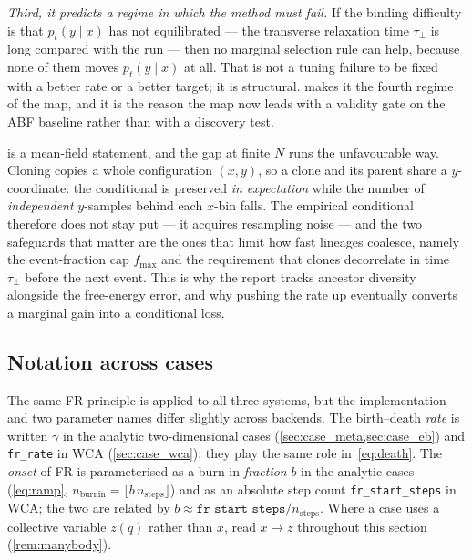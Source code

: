\emph{Third, it predicts a regime in which the method must fail.} If the binding difficulty
is that $p_t(y\mid x)$ has not equilibrated --- the transverse relaxation time
$\tau_\perp$ is long compared with the run --- then no marginal selection rule can help,
because none of them moves $p_t(y\mid x)$ at all. That is not a tuning failure to be fixed
with a better rate or a better target; it is structural.  makes it the
fourth regime of the map, and it is the reason the map now leads with a validity gate on the
ABF baseline rather than with a discovery test.

\begin{remark}
\label{rem:finite_n_conditional}
 is a mean-field statement, and the gap at finite $N$ runs the
unfavourable way. Cloning copies a whole configuration $(x,y)$, so a clone and its parent
share a $y$-coordinate: the conditional is preserved \emph{in expectation} while the number
of \emph{independent} $y$-samples behind each $x$-bin falls. The empirical conditional
therefore does not stay put --- it acquires resampling noise --- and the two safeguards that
matter are the ones that limit how fast lineages coalesce, namely the event-fraction cap
$f_{\max}$ and the requirement that clones decorrelate in time $\tau_\perp$ before the next
event. This is why the report tracks ancestor diversity alongside the free-energy error, and
why pushing the rate up eventually converts a marginal gain into a conditional loss.
\end{remark}

\subsection{Notation across cases}
\label{sec:fr_notation}
The same FR principle is applied to all three systems, but the implementation and
two parameter names differ slightly across backends. The birth--death \emph{rate}
is written $\gamma$ in the analytic two-dimensional cases
(\cref{sec:case_meta,sec:case_eb}) and \texttt{fr\_rate} in WCA
(\cref{sec:case_wca}); they play the same role in~\eqref{eq:death}. The
\emph{onset} of FR is parameterised as a burn-in \emph{fraction} $b$ in the
analytic cases (\eqref{eq:ramp}, $n_{\mathrm{burnin}}=\lfloor b\,
n_{\mathrm{steps}}\rfloor$) and as an absolute step count
\texttt{fr\_start\_steps} in WCA; the two are related by
$b\approx\texttt{fr\_start\_steps}/n_{\mathrm{steps}}$. Where a case uses a
collective variable $z(q)$ rather than $x$, read $x\mapsto z$ throughout this
section (\cref{rem:manybody}).

